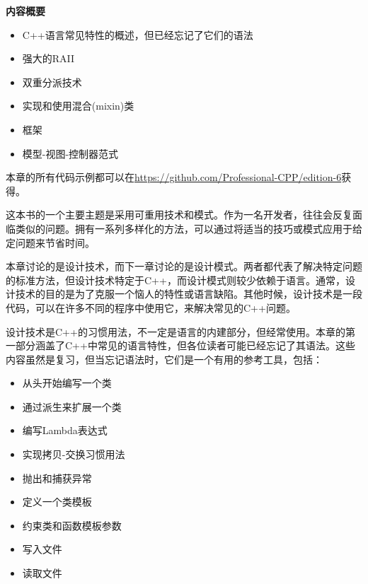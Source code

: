 \noindent
\textbf{内容概要}

\begin{itemize}
\item
C++语言常见特性的概述，但已经忘记了它们的语法

\item
强大的RAII

\item
双重分派技术

\item
实现和使用混合(mixin)类

\item
框架

\item
模型-视图-控制器范式
\end{itemize}

本章的所有代码示例都可以在\url{https://github.com/Professional-CPP/edition-6}获得。

这本书的一个主要主题是采用可重用技术和模式。作为一名开发者，往往会反复面临类似的问题。拥有一系列多样化的方法，可以通过将适当的技巧或模式应用于给定问题来节省时间。

本章讨论的是设计技术，而下一章讨论的是设计模式。两者都代表了解决特定问题的标准方法，但设计技术特定于C++，而设计模式则较少依赖于语言。通常，设计技术的目的是为了克服一个恼人的特性或语言缺陷。其他时候，设计技术是一段代码，可以在许多不同的程序中使用它，来解决常见的C++问题。

设计技术是C++的习惯用法，不一定是语言的内建部分，但经常使用。本章的第一部分涵盖了C++中常见的语言特性，但各位读者可能已经忘记了其语法。这些内容虽然是复习，但当忘记语法时，它们是一个有用的参考工具，包括：

\begin{itemize}
\item
从头开始编写一个类

\item
通过派生来扩展一个类

\item
编写Lambda表达式

\item
实现拷贝-交换习惯用法

\item
抛出和捕获异常

\item
定义一个类模板

\item
约束类和函数模板参数

\item
写入文件

\item
读取文件
\end{itemize}

